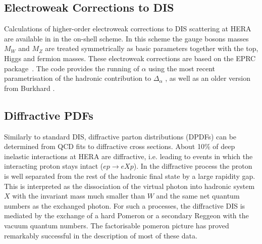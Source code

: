 \subsection{Electroweak Corrections to DIS}
Calculations of higher-order electroweak corrections to DIS scattering at 
HERA are available in \fitter in the on-shell scheme. In this scheme the
gauge bosons masses $M_W$ and 
$M_Z$ are treated symmetrically as basic parameters together with the top, 
Higgs and fermion masses.
These electroweak corrections 
are based on the EPRC package~\cite{SpiesbergerPrivComm}.
The code provides the running of $\alpha$ using the most recent parametrisation
of the hadronic contribution to $\Delta_\alpha$ \cite{Jegerlehner}, as well as 
an older version from Burkhard \cite{Burkhard}.



\subsection{Diffractive PDFs}

\newcommand{\asotp}{\ensuremath{\frac{\alpha_{\rm s}}{2\pi}}}
\newcommand{\Sgl}[1]{\ensuremath{\tilde f_{#1+}}}
\newcommand{\Pom}{{I\!P}}
\newcommand{\Reg}{{I\!R}}
\newcommand{\xpom}{$x_{I\!P}$}


Similarly to standard DIS, diffractive parton distributions (DPDFs) 
can be determined from QCD fits to diffractive cross sections.
About 10\% of deep inelastic interactions at HERA are diffractive, i.e. leading to
events in which the interacting proton stays intact ($ep\to eXp$). 
In the diffractive process the proton is well separated from the 
rest of the hadronic final state by a large rapidity gap.  
This is interpreted as the dissociation of the virtual photon into
hadronic system $X$ with the invariant mass much 
smaller than $W$ and the same net quantum numbers as the exchanged photon.
For such a processes, the 
diffractive DIS is mediated by the exchange of a hard Pomeron 
or a secondary Reggeon with the vacuum quantum numbers. 
The factorisable pomeron picture has proved remarkably successful in the description of most of these data.
%

